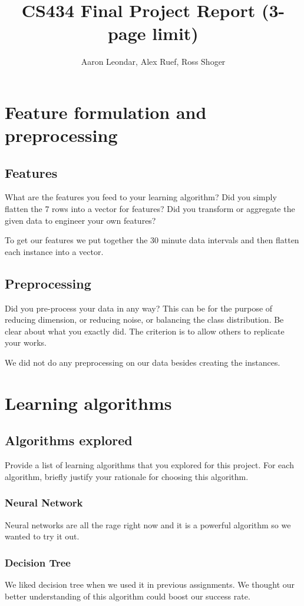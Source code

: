 \documentclass[11pt,a4paper]{article}
\title{CS434 Final Project Report (3-page limit)}
\author{Aaron Leondar, Alex Ruef, Ross Shoger}
\date{}
\begin{document}
\maketitle
\section{Feature formulation and preprocessing}
	\subsection{Features}
	What are the features you feed to your learning algorithm?
	Did you simply flatten the 7 rows into a vector for features?
	Did you transform or aggregate the given data to engineer your own features?

	To get our features we put together the 30 minute data intervals and then flatten each instance into a vector.

	\subsection{Preprocessing}
		Did you pre-process your data in any way?
		This can be for the purpose of reducing dimension, or reducing noise, or balancing the class distribution.
		Be clear about what you exactly did.
		The criterion is to allow others to replicate your works.

		We did not do any preprocessing on our data besides creating the instances.

\section{Learning algorithms}
	\subsection{Algorithms explored}
		Provide a list of learning algorithms that you explored for this project.
		For each algorithm, briefly justify your rationale for choosing this algorithm.

		\subsubsection{Neural Network}
			Neural networks are all the rage right now and it is a powerful algorithm so we wanted to try it out.

		\subsubsection{Decision Tree}
			We liked decision tree when we used it in previous assignments.
			We thought our better understanding of this algorithm could boost our success rate.
\end{document}
